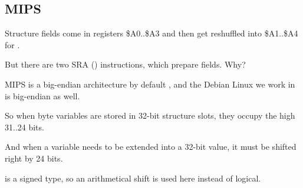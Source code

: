 \subsection{MIPS}
\label{MIPS_structure_big_endian}



Structure fields come in registers \$A0..\$A3 and then get reshuffled into \$A1..\$A4 for \printf.

But there are two SRA () instructions, which prepare \Tchar fields.
Why?

MIPS is a big-endian architecture by default , and the Debian Linux we work in is big-endian as well.

So when byte variables are stored in 32-bit structure slots, they occupy the high 31..24 bits.

And when a \Tchar variable needs to be extended into a 32-bit value, it must be shifted right by 24 bits.

\Tchar is a signed type, so an arithmetical shift is used here instead of logical.
